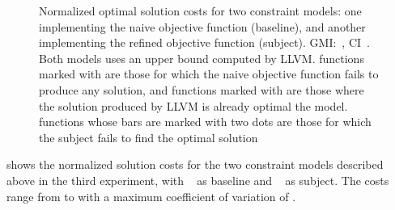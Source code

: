 \begin{figure}
  \centering%
  \maxsizebox{\textwidth}{!}{%
    \trimBarchartPlot{%
    }%
  }

  \caption[%
            Plot for evaluating the different objective functions' impact on
            code quality%
          ]%
          {%
            Normalized optimal solution costs for two constraint models: one
            implementing the naive objective function (baseline), and another
            implementing the refined objective function (subject).
            GMI:~\printGMI{%
              \ObjFunRefinedVsNaiveCyclesSpeedupRefinedVsNaiveWUbCyclesRegularSpeedupGmean%
            },
            CI~\printGMICI{%
              \ObjFunRefinedVsNaiveCyclesSpeedupRefinedVsNaiveWUbCyclesRegularSpeedupCiMin%
            }{%
              \ObjFunRefinedVsNaiveCyclesSpeedupRefinedVsNaiveWUbCyclesRegularSpeedupCiMax%
            }.
            Both models uses an upper bound computed by LLVM.
            \Glspl{function} marked with \barValueNoBaselineSolution{} are
            those for which the naive objective function fails to produce any
            solution, and \glspl{function} marked with \barValueNoSolution{} are
            those where the solution produced by \gls{LLVM} is already optimal
            \wrt the model.
            \Glspl{function} whose bars are marked with two dots are those
            for which the \gls{subject} fails to find the optimal solution%
          }
\end{figure}

 shows the normalized
\gls{solution} costs for the two \glspl{constraint model} described above in the
third experiment, with ~
as \gls{baseline} and ~
as \gls{subject}.
%
The costs range from
\printMinCycles{
  \ObjFunRefinedVsNaiveCyclesSpeedupNaiveWUbCyclesAvgMin,
  \ObjFunRefinedVsNaiveCyclesSpeedupRefinedWUbCyclesAvgMin
} to
\printMaxCycles{
  \ObjFunRefinedVsNaiveCyclesSpeedupNaiveWUbCyclesAvgMax,
  \ObjFunRefinedVsNaiveCyclesSpeedupRefinedWUbCyclesAvgMax
} with a maximum coefficient of variation of
\numMaxOf{
  \ObjFunRefinedVsNaiveCyclesSpeedupNaiveWUbCyclesCvMax,
  \ObjFunRefinedVsNaiveCyclesSpeedupRefinedWUbCyclesCvMax
}.

